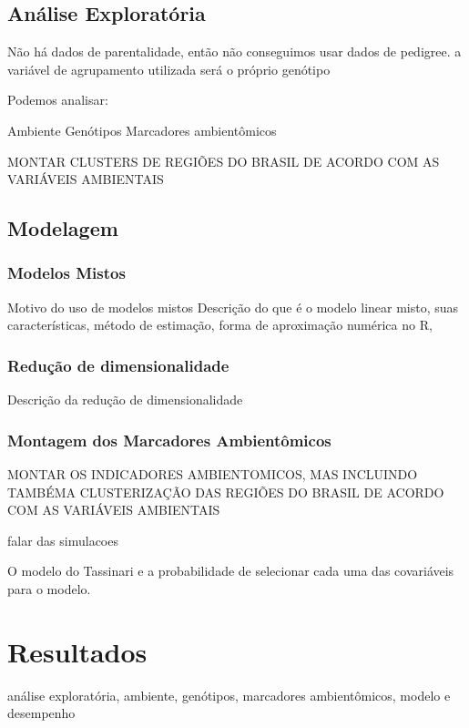 \documentclass[12pt, a4paper, twoside]{report}
\numberwithin{equation}{subsection} %
\begin{document}
\section{Análise Exploratória}

Não há dados de parentalidade, então não conseguimos usar dados de pedigree. a variável de agrupamento utilizada será o próprio genótipo

Podemos analisar:

Ambiente
Genótipos
Marcadores ambientômicos

MONTAR CLUSTERS DE REGIÕES DO BRASIL DE ACORDO COM AS VARIÁVEIS AMBIENTAIS

\section{Modelagem}

\subsection{Modelos Mistos}

Motivo do uso de modelos mistos
Descrição do que é o modelo linear misto, suas características, método de estimação, forma de aproximação numérica no R,

\subsection{Redução de dimensionalidade}

Descrição da redução de dimensionalidade

\subsection{Montagem dos Marcadores Ambientômicos}

MONTAR OS INDICADORES AMBIENTOMICOS, MAS INCLUINDO TAMBÉMA CLUSTERIZAÇÃO DAS REGIÕES DO BRASIL DE ACORDO COM AS VARIÁVEIS AMBIENTAIS

falar das simulacoes

O modelo do Tassinari e a probabilidade de selecionar cada uma das covariáveis para o modelo.


\chapter{Resultados}

análise exploratória, ambiente, genótipos, marcadores ambientômicos, modelo e desempenho
\end{document}

